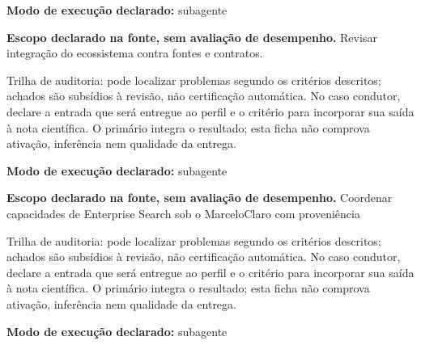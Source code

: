 \begin{arquitetura}
\textbf{Modo de execução declarado:} subagente
\end{arquitetura}


\begin{descricao}
\textbf{Escopo declarado na fonte, sem avaliação de desempenho.}
Revisar integração do ecossistema contra fontes e contratos.
\end{descricao}

\begin{funcao}
Trilha de auditoria: pode localizar problemas segundo os critérios descritos; achados são subsídios à revisão, não certificação automática. No caso condutor, declare a entrada que será entregue ao perfil e o critério para incorporar sua saída à nota científica. O primário integra o resultado; esta ficha não comprova ativação, inferência nem qualidade da entrega.
\end{funcao}

\begin{arquitetura}
\textbf{Modo de execução declarado:} subagente
\end{arquitetura}


\begin{descricao}
\textbf{Escopo declarado na fonte, sem avaliação de desempenho.}
Coordenar capacidades de Enterprise Search sob o MarceloClaro com proveniência
\end{descricao}

\begin{funcao}
Trilha de auditoria: pode localizar problemas segundo os critérios descritos; achados são subsídios à revisão, não certificação automática. No caso condutor, declare a entrada que será entregue ao perfil e o critério para incorporar sua saída à nota científica. O primário integra o resultado; esta ficha não comprova ativação, inferência nem qualidade da entrega.
\end{funcao}

\begin{arquitetura}
\textbf{Modo de execução declarado:} subagente
\end{arquitetura}

